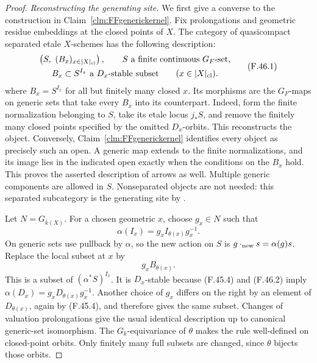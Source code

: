\documentclass[11pt]{article}
\begin{document}
\begin{proof}
\emph{Reconstructing the generating site.}
We first give a converse to the construction in
Claim~\ref{clm:FFgenerickernel}. Fix prolongations and
geometric residue embeddings at the closed points of
\(X\). The category of quasicompact separated etale
\(X\)-schemes has the following description:
\[
 \begin{gathered}
 \left(S,\ (B_x)_{x\in|X|_{\rm cl}}\right),
 \qquad S\text{ a finite continuous }G_F\text{-set},\\
 B_x\subset S^{I_x}\text{ a }D_x\text{-stable subset}
       \qquad(x\in|X|_{\rm cl}).
 \end{gathered}
                                                        \tag{F.46.1}
\]
where \(B_x=S^{I_x}\) for all but finitely many closed
\(x\). Its morphisms are the \(G_F\)-maps on generic
sets that take every \(B_x\) into its counterpart.
Indeed, form the finite normalization belonging to
\(S\), take its etale locus \(j_*S\), and remove
the finitely many closed points specified by the omitted
\(D_x\)-orbits. This reconstructs the object. Conversely,
Claim~\ref{clm:FFgenerickernel} identifies every object
as precisely such an open. A generic map extends to the
finite normalizations, and its image lies in the indicated
open exactly when the conditions on the \(B_x\) hold.
This proves the asserted description of arrows as well.
Multiple generic components are allowed in \(S\).
Nonseparated objects are not needed: this separated
subcategory is the generating site by
\citet[Theorem~A.8 and Corollary~A.11]{FF_CHW2024}.

Let \(N=G_{\bar k(X)}\). For a chosen geometric
\(x\), choose \(g_x\in N\) such that
\[
                  \alpha(I_x)=g_x I_{\theta(x)}g_x^{-1}.
                                                        \tag{F.46.2}
\]
On generic sets use pullback by \(\alpha\), so the new
action on \(S\) is \(g\cdot_{\rm new}s=\alpha(g)s\).
Replace the local subset at \(x\) by
\[
                                g_x B_{\theta(x)}.
                                                        \tag{F.46.3}
\]
This is a subset of \((\alpha^*S)^{I_x}\). It is
\(D_x\)-stable because (F.45.4) and (F.46.2) imply
\(\alpha(D_x)=g_xD_{\theta(x)}g_x^{-1}\).
Another choice of \(g_x\) differs on the right by an
element of \(D_{\theta(x)}\), again by (F.45.4), and
therefore gives the same subset. Changes of valuation
prolongations give the usual identical description up
to canonical generic-set isomorphism. The
\(G_k\)-equivariance of \(\theta\) makes the rule
well-defined on closed-point orbits. Only finitely many
full subsets are changed, since \(\theta\) bijects
those orbits.


\end{proof}
\end{document}
